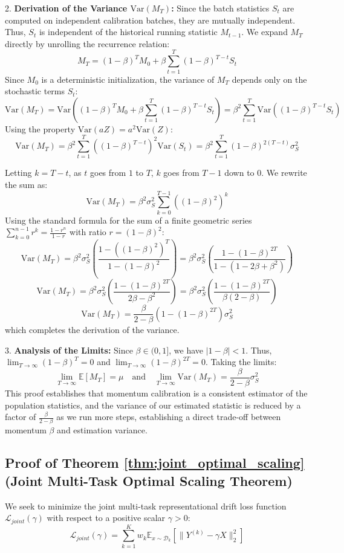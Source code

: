 \documentclass{article}
\theoremstyle{plain}
\theoremstyle{definition}
\theoremstyle{remark}
\begin{document}
2. \textbf{Derivation of the Variance $\text{Var}(M_T)$:}
Since the batch statistics $S_t$ are computed on independent calibration batches, they are mutually independent. Thus, $S_t$ is independent of the historical running statistic $M_{t-1}$.
We expand $M_T$ directly by unrolling the recurrence relation:
$$M_T = (1 - \beta)^T M_0 + \beta \sum_{t=1}^T (1 - \beta)^{T-t} S_t$$
Since $M_0$ is a deterministic initialization, the variance of $M_T$ depends only on the stochastic terms $S_t$:
$$\text{Var}(M_T) = \text{Var}\left( (1 - \beta)^T M_0 + \beta \sum_{t=1}^T (1 - \beta)^{T-t} S_t \right) = \beta^2 \sum_{t=1}^T \text{Var}\left( (1 - \beta)^{T-t} S_t \right)$$
Using the property $\text{Var}(a Z) = a^2 \text{Var}(Z)$:
$$\text{Var}(M_T) = \beta^2 \sum_{t=1}^T \left( (1 - \beta)^{T-t} \right)^2 \text{Var}(S_t) = \beta^2 \sum_{t=1}^T (1 - \beta)^{2(T-t)} \sigma_S^2$$

Letting $k = T-t$, as $t$ goes from $1$ to $T$, $k$ goes from $T-1$ down to $0$. We rewrite the sum as:
$$\text{Var}(M_T) = \beta^2 \sigma_S^2 \sum_{k=0}^{T-1} \left( (1 - \beta)^2 \right)^k$$
Using the standard formula for the sum of a finite geometric series $\sum_{k=0}^{n-1} r^k = \frac{1 - r^n}{1 - r}$ with ratio $r = (1 - \beta)^2$:
$$\text{Var}(M_T) = \beta^2 \sigma_S^2 \left( \frac{1 - \left((1 - \beta)^2\right)^T}{1 - (1 - \beta)^2} \right) = \beta^2 \sigma_S^2 \left( \frac{1 - (1 - \beta)^{2T}}{1 - (1 - 2\beta + \beta^2)} \right)$$
$$\text{Var}(M_T) = \beta^2 \sigma_S^2 \left( \frac{1 - (1 - \beta)^{2T}}{2\beta - \beta^2} \right) = \beta^2 \sigma_S^2 \left( \frac{1 - (1 - \beta)^{2T}}{\beta(2 - \beta)} \right)$$
$$\text{Var}(M_T) = \frac{\beta}{2 - \beta} \left( 1 - (1 - \beta)^{2T} \right) \sigma_S^2$$
which completes the derivation of the variance.

3. \textbf{Analysis of the Limits:}
Since $\beta \in (0, 1]$, we have $|1 - \beta| < 1$. Thus, $\lim_{T \to \infty} (1 - \beta)^T = 0$ and $\lim_{T \to \infty} (1 - \beta)^{2T} = 0$.
Taking the limits:
$$\lim_{T \to \infty} \mathbb{E}[M_T] = \mu \quad \text{and} \quad \lim_{T \to \infty} \text{Var}(M_T) = \frac{\beta}{2 - \beta} \sigma_S^2$$
This proof establishes that momentum calibration is a consistent estimator of the population statistics, and the variance of our estimated statistic is reduced by a factor of $\frac{\beta}{2 - \beta}$ as we run more steps, establishing a direct trade-off between momentum $\beta$ and estimation variance.

\subsection{Proof of Theorem \ref{thm:joint_optimal_scaling} (Joint Multi-Task Optimal Scaling Theorem)}
We seek to minimize the joint multi-task representational drift loss function $\mathcal{L}_{joint}(\gamma)$ with respect to a positive scalar $\gamma > 0$:
$$\mathcal{L}_{joint}(\gamma) = \sum_{k=1}^K w_k \mathbb{E}_{x \sim \mathcal{D}_k} \left[ \| Y^{(k)} - \gamma X \|_2^2 \right]$$
\end{document}
